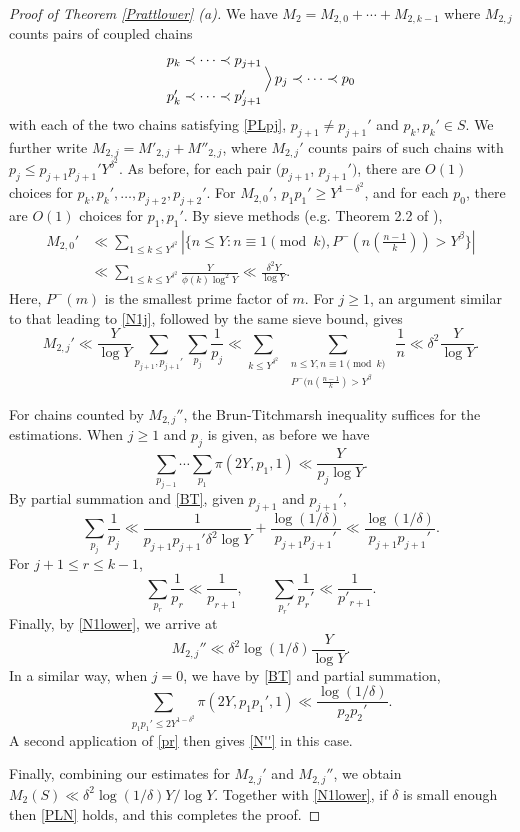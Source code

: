 \documentclass[12pt]{amsart}
\theoremstyle{remark}
\theoremstyle{plain}
\numberwithin{equation}{section}
\newcommand{\be}{\begin{equation}}
\newcommand{\ee}{\end{equation}}
\renewcommand{\b}{\ensuremath{\beta}}
\newcommand{\del}{\ensuremath{\delta}}
\renewcommand{\(}{\left(}
\renewcommand{\)}{\right)}
\renewcommand{\le}{\leqslant}
\renewcommand{\ge}{\geqslant}
\begin{document}
\begin{proof}[Proof of Theorem \ref{Prattlower} (a)]
We have $M_2 = M_{2,0}+\cdots+M_{2,k-1}$
where $M_{2,j}$ counts pairs of coupled chains
$$
\begin{matrix}
p_k \prec \cdots \prec p_{j+1} \\
\vspace{0.7mm} \\
p_k' \prec \cdots \prec p_{j+1}'
\end{matrix}
\, \Big> \, p_j \prec \cdots \prec p_0
$$
with each of the two chains satisfying \eqref{PLpj}, $p_{j+1} \ne
p_{j+1}'$ and $p_k, p_k'\in S$.  We further write $M_{2,j} =
M'_{2,j} + M''_{2,j}$, where $M_{2,j}'$ counts pairs of such chains
with $p_j \le p_{j+1} p_{j+1}' Y^{\del^2}$.  As before, for each
pair $(p_{j+1}$, $p_{j+1}')$, there are $O(1)$ choices for $p_k,
p_k', \ldots, p_{j+2}, p_{j+2}'$.  For $M_{2,0}'$,
$p_1p_1' \ge Y^{1-\del^2}$, and for each $p_0$, there are $O(1)$ choices
for $p_1,p_1'$.  By sieve methods (e.g. Theorem 2.2 of \cite{HR}),
\begin{align*}
M_{2,0}' &\ll
\sum_{1\le k\le Y^{\del^2}} | \{ n\le Y : n\equiv 1 \!\!\! \pmod{k}, P^-(n
(\tfrac{n-1}{k})) >Y^\b \}| \\
&\ll  \sum_{1\le k\le Y^{\del^2}} \frac{Y}{\phi(k)\log^2 Y} 
\ll \frac{\del^2 Y}{\log Y}.
\end{align*}
Here, $P^-(m)$ is the smallest prime factor of $m$.
For $j\ge 1$, an argument similar to that leading to \eqref{N1j}, followed by the same sieve bound, gives
\[
 M_{2,j}' \ll \frac{Y}{\log Y} \sum_{p_{j+1},p_{j+1}'} \sum_{p_j}
\frac{1}{p_j} \ll \sum_{k\le Y^{\del^2}} \; \sum_{\substack{n\le Y, n\equiv 1\!
\!\!\pmod{k} \\ P^-(n(\frac{n-1}{k})>Y^{\b}}} \; \frac{1}{n}\ll \del^2 \frac{Y} 
{\log Y}.
\]

For chains counted by
$M_{2,j}''$, the Brun-Titchmarsh inequality suffices for the
estimations.  When $j\ge 1$ and $p_j$ is given, as before we have
$$
\sum_{p_{j-1}} \cdots \sum_{p_1} \pi(2Y,p_1,1) \ll \frac{Y}{p_j \log Y}.
$$
By partial summation and \eqref{BT}, given $p_{j+1}$ and $p_{j+1}'$,
$$
\sum_{p_j} \frac{1}{p_j} \ll
\frac{1}{p_{j+1} p_{j+1}' \del^2 \log Y} + \frac{\log
  (1/\del)}{p_{j+1} p_{j+1}'} \ll  \frac{\log
  (1/\del)}{p_{j+1} p_{j+1}'}.
$$
For $j+1 \le r \le k-1$, 
\be\label{pr} \sum_{p_r} \frac1{p_r} \ll
\frac{1}{p_{r+1}}, \qquad \sum_{p_r'} \frac{1}{p_r'} \ll
\frac{1}{p'_{r+1}}. 
\ee 
Finally, by \eqref{N1lower}, we arrive at
\be\label{N''} 
M_{2,j}'' \ll \del^2 \log(1/\del) \frac{Y}{\log Y}.
\ee 
In a similar way, when $j=0$, we have by \eqref{BT} and partial
summation,
$$
\sum_{p_1p_1'\le 2Y^{1-\del^2}} \pi(2Y,p_1 p_1',1) \ll
\frac{\log(1/\del)}{p_2 p_2'}.
$$
A second application of \eqref{pr} then gives \eqref{N''} in this case.

Finally, combining our estimates for $M_{2,j}'$ and $M_{2,j}''$, we obtain
$M_2(S) \ll \del^2 \log(1/\del) Y/\log Y.$
Together with \eqref{N1lower}, if $\del$ is small enough then
\eqref{PLN} holds, and this completes the proof.
\end{proof}
\end{document}
